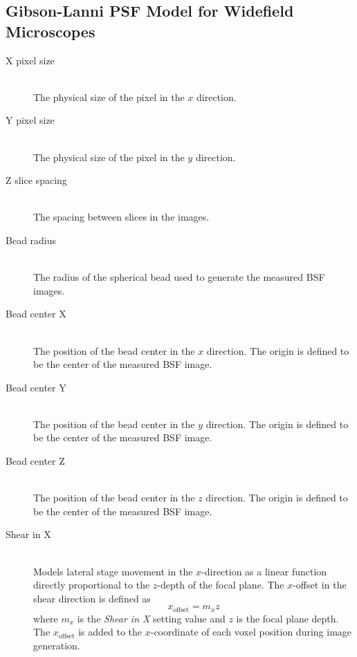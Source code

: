 \documentclass[11pt,titlepage,twoside]{article}
\begin{document}
\subsection{Gibson-Lanni PSF Model for Widefield Microscopes}

\begin{description}

  \item[X pixel size] \hfill \\
   The physical size of the pixel in the $x$ direction.
  
  \item[Y pixel size] \hfill \\
   The physical size of the pixel in the $y$ direction.
  
  \item[Z slice spacing] \hfill \\
   The spacing between slices in the images.
  
  \item[Bead radius] \hfill \\
   The radius of the spherical bead used to generate the measured BSF images.
  
  \item[Bead center X] \hfill \\
   The position of the bead center in the $x$ direction. The origin is defined to be the center of the measured BSF image.
  
  \item[Bead center Y] \hfill \\
   The position of the bead center in the $y$ direction. The origin is defined to be the center of the measured BSF image.
  
  \item[Bead center Z] \hfill \\
   The position of the bead center in the $z$ direction. The origin is defined to be the center of the measured BSF image.
    
  \item[Shear in X] \hfill \\
Models lateral stage movement in the $x$-direction as a linear function directly proportional to the $z$-depth of the focal plane. The $x$-offset in the shear direction is defined as
\begin{equation}
x_{\mathrm{offset}} = m_{x} z
\end{equation}
where $m_{x}$ is the \emph{Shear in X} setting value and $z$ is the focal plane depth. The $x_{\mathrm{offset}}$ is added to the $x$-coordinate of each voxel position during image generation.


\end{description}
\end{document}
